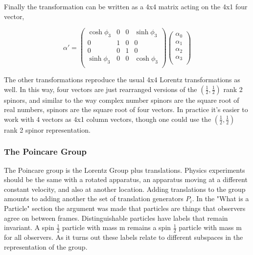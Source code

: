Finally the transformation can be written as a 4x4 matrix acting on the 4x1 four vector,

\begin{equation}
\alpha' = 
\begin{pmatrix}
\cosh\phi_3 & 0 & 0 & \sinh\phi_3 \\
0 & 1 & 0 & 0 \\
0 & 0 & 1 & 0 \\
\sinh\phi_3 & 0 & 0 & \cosh\phi_3 \\
\end{pmatrix}
\begin{pmatrix}
\alpha_0 \\
\alpha_1 \\
\alpha_2 \\
\alpha_3 \\
\end{pmatrix}
\end{equation}

The other transformations reproduce the usual 4x4 Lorentz transformations as well. In this way, four vectors are just rearranged versions of the $(\frac{1}{2}, \frac{1}{2})$ rank 2 spinors, and similar to the way complex number spinors are the square root of real numbers, spinors are the square root of four vectors. In practice it's easier to work with 4 vectors as 4x1 column vectors, though one could use the $(\frac{1}{2}, \frac{1}{2})$ rank 2 spinor representation.  

\subsubsection{The Poincare Group}

The Poincare group is the Lorentz Group plus translations. Physics experiments should be the same with a rotated apparatus, an apparatus moving at a different constant velocity, and also at another location. Adding translations to the group amounts to adding another the set of translation generators $P_i$. In the "What is a Particle" section the argument was made that particles are things that observers agree on between frames. Distinguishable particles have labels that remain invariant. A spin $\frac{1}{2}$ particle with mass m remains a spin $\frac{1}{2}$ particle with mass m for all observers. As it turns out these labels relate to different subspaces in the representation of the group.

